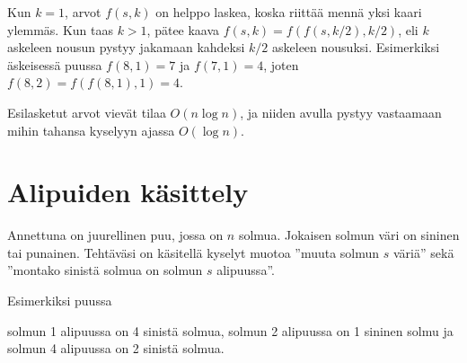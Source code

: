 Kun $k=1$, arvot $f(s,k)$ on helppo laskea,
koska riittää mennä yksi kaari ylemmäs.
Kun taas $k>1$, pätee kaava
$f(s,k)=f(f(s,k/2),k/2)$, eli $k$ askeleen
nousun pystyy jakamaan kahdeksi $k/2$
askeleen nousuksi.
Esimerkiksi äskeisessä puussa $f(8,1)=7$
ja $f(7,1)=4$, joten $f(8,2)=f(f(8,1),1)=4$.

Esilasketut arvot vievät tilaa $O(n \log n)$,
ja niiden avulla pystyy vastaamaan
mihin tahansa kyselyyn ajassa $O(\log n)$.

\section{Alipuiden käsittely}

\begin{task}
Annettuna on juurellinen puu, jossa on $n$ solmua.
Jokaisen solmun väri on sininen tai punainen.
Tehtäväsi on käsitellä kyselyt muotoa
''muuta solmun $s$ väriä'' sekä
''montako sinistä solmua on
solmun $s$ alipuussa''.
\end{task}

Esimerkiksi puussa
\begin{center}
\end{center}
solmun 1 alipuussa on 4 sinistä solmua,
solmun 2 alipuussa on 1 sininen solmu
ja solmun 4 alipuussa on 2 sinistä solmua.

